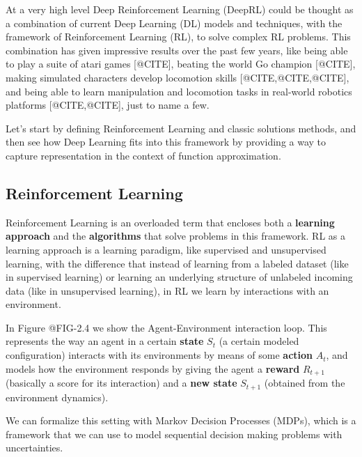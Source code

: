 At a very high level Deep Reinforcement Learning (DeepRL) could be thought as a combination 
of current Deep Learning (DL) models and techniques, with the framework of Reinforcement 
Learning (RL), to solve complex RL problems. This combination has given impressive 
results over the past few years, like being able to play a suite of atari games [@CITE], 
beating the world Go champion [@CITE], making simulated characters develop locomotion
skills [@CITE,@CITE,@CITE], and being able to learn manipulation and locomotion tasks in 
real-world robotics platforms [@CITE,@CITE], just to name a few.

\figdrlsamplesFirst

\figdrlsamplesSecond

\figdrlsamplesThird

Let's start by defining Reinforcement Learning and classic solutions methods, and then
see how Deep Learning fits into this framework by providing a way to capture representation
in the context of function approximation.

\subsection{Reinforcement Learning}

Reinforcement Learning is an overloaded term that encloses both a \textbf{learning approach}
and the \textbf{algorithms} that solve problems in this framework. RL as a learning approach
is a learning paradigm, like supervised and unsupervised learning, with the difference that
instead of learning from a labeled dataset (like in supervised learning) or learning an underlying
structure of unlabeled incoming data (like in unsupervised learning), in RL we learn by interactions
with an environment.

In Figure @FIG-2.4 we show the Agent-Environment interaction loop. This represents
the way an agent in a certain \textbf{state} $S_{t}$ (a certain modeled configuration) interacts 
with its environments by means of some \textbf{action} $A_{t}$, and models how the environment 
responds by giving the agent a \textbf{reward} $R_{t+1}$ (basically a score for its interaction) 
and a \textbf{new state} $S_{t+1}$ (obtained from the environment dynamics).

\figrlloop

We can formalize this setting with Markov Decision Processes (MDPs), which is a framework
that we can use to model sequential decision making problems with uncertainties.

